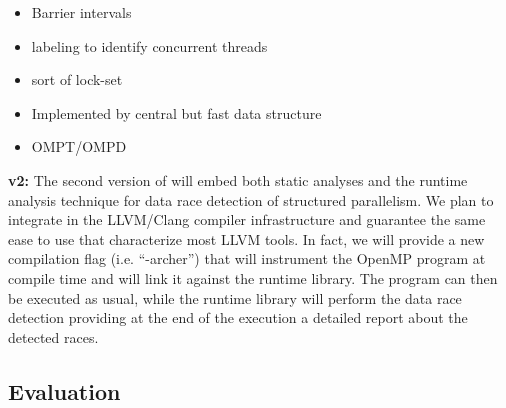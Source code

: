 \begin{itemize}
\item Barrier intervals
\item labeling to identify concurrent threads
\item sort of lock-set
\item Implemented by central but fast data structure
\item OMPT/OMPD
\end{itemize}

\textbf{\archer v2:} The second version of \archer will embed both static
analyses and the runtime analysis technique for data race detection of
structured parallelism.
%
We plan to integrate \archer in the LLVM/Clang compiler infrastructure and
guarantee the same ease to use that characterize most LLVM tools.
%
In fact, we will provide a new compilation flag (i.e. ``-archer'') that will
instrument the OpenMP program at compile time and will link it against the
\archer runtime library.
%
The program can then be executed as usual, while the \archer runtime library
will perform the data race detection providing at the end of the execution a
detailed report about the detected races.

\subsection{Evaluation}
\label{subsec:evaluation}

